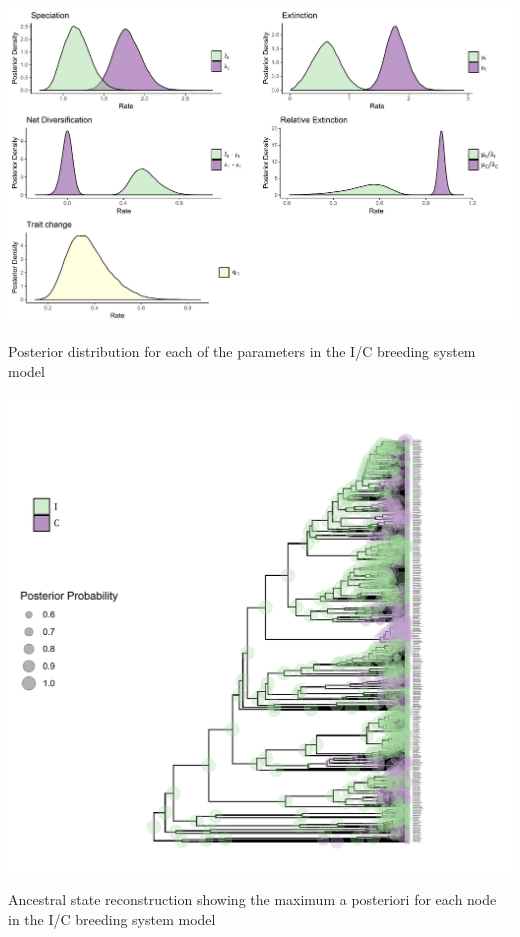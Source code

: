 \begin{suppfigure}
\includegraphics[width=\textwidth]{bisseSIposteriordist.pdf}
\caption{Posterior distribution for each of the parameters in the I/C breeding system model} %
\label{suppfigure:IC}
\end{suppfigure}

\begin{suppfigure}
\includegraphics[width=\textwidth]{asrIC.pdf}
\caption{Ancestral state reconstruction showing the maximum a posteriori for each node in the I/C breeding system model} %
\label{suppfigure:ICasr}
\end{suppfigure}

